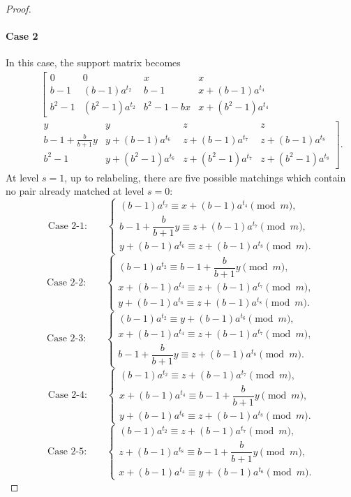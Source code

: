 \documentclass[11pt]{article}
\newcommand{\mymod}{\pmod{m}}
\begin{document}
\begin{proof}
\paragraph{Case 2}
In this case, the support matrix becomes
\begin{eqnarray*}
		~&~&\left[\begin{array}{cccc}
			0 & 0 
			& x & x \\
            b-1 & (b-1)a^{t_2} 
			& b-1 & x+(b-1)a^{t_4}\\
            b^2 -1 & (b^2-1)a^{t_2} 
			& b^2-1-bx & x+(b^2-1)a^{t_4}
            \end{array}
            \right.\\
			~&~& \left. \begin{array}{cccc}            
			y & y 
			& z & z\\			
			  b-1+\frac{b}{b+1}y  & y+(b-1)a^{t_6}
			& z+(b-1)a^{t_7} & z+(b-1)a^{t_8} \\
			  b^2-1 & y+(b^2-1)a^{t_6}
			& z+(b^2-1)a^{t_7} & z+(b^2-1)a^{t_8}
        \end{array}
        \right]
        .
\end{eqnarray*}
At level $s=1$, up to relabeling, there are five possible matchings which contain no pair already matched at level $s=0$:
\[
\text{Case 2-1:}\qquad
\begin{cases}
(b-1)a^{t_2} \equiv x+(b-1)a^{t_4}\mymod,\\
b-1+\dfrac{b}{b+1}y \equiv z+(b-1)a^{t_7}\mymod,\\
y+(b-1)a^{t_6} \equiv z+(b-1)a^{t_8}\mymod.
\end{cases}
\]
\[
\text{Case 2-2:}\qquad
\begin{cases}
(b-1)a^{t_2} \equiv b-1+\dfrac{b}{b+1}y\mymod,\\
x+(b-1)a^{t_4} \equiv z+(b-1)a^{t_7}\mymod,\\
y+(b-1)a^{t_6} \equiv z+(b-1)a^{t_8}\mymod.
\end{cases}
\]
\[
\text{Case 2-3:}\qquad
\begin{cases}
(b-1)a^{t_2} \equiv y+(b-1)a^{t_6}\mymod,\\
x+(b-1)a^{t_4} \equiv z+(b-1)a^{t_7}\mymod,\\
b-1+\dfrac{b}{b+1}y \equiv z+(b-1)a^{t_8}\mymod.
\end{cases}
\]
\[
\text{Case 2-4:}\qquad
\begin{cases}
(b-1)a^{t_2} \equiv z+(b-1)a^{t_7}\mymod,\\
x+(b-1)a^{t_4} \equiv b-1+\dfrac{b}{b+1}y\mymod,\\
y+(b-1)a^{t_6} \equiv z+(b-1)a^{t_8}\mymod.
\end{cases}
\]
\[
\text{Case 2-5:}\qquad
\begin{cases}
(b-1)a^{t_2} \equiv z+(b-1)a^{t_7}\mymod,\\
z+(b-1)a^{t_8} \equiv b-1+\dfrac{b}{b+1}y\mymod,\\
x+(b-1)a^{t_4} \equiv y+(b-1)a^{t_6}\mymod.
\end{cases}
\]


\end{proof}
\end{document}

